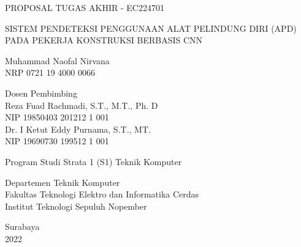\begin{large}
  PROPOSAL TUGAS AKHIR - EC224701
\end{large}

\vspace{\fill}

\begin{spacing}{1.5}
  \begin{Large}
    SISTEM PENDETEKSI PENGGUNAAN ALAT PELINDUNG DIRI (APD) PADA PEKERJA KONSTRUKSI BERBASIS CNN
  \end{Large}
\end{spacing}

\vspace{\fill}

\begin{large}
  Muhammad Naofal Nirvana \\
  \textnormal{NRP 0721 19 4000 0066}
\end{large}

\vspace{\fill}

\begin{large}
  \textnormal{Dosen Pembimbing} \\
  Reza Fuad Rachmadi, S.T., M.T., Ph. D \\
  \textnormal{NIP 19850403 201212 1 001} \\
  Dr. I Ketut Eddy Purnama, S.T., MT. \\
  \textnormal{NIP 19690730 199512 1 001}
\end{large}

\vspace{\fill}

Program Studi Strata 1 (S1) Teknik Komputer \\

\normalfont

Departemen Teknik Komputer \\
Fakultas Teknologi Elektro dan Informatika Cerdas \\
Institut Teknologi Sepuluh Nopember

Surabaya \\
2022
